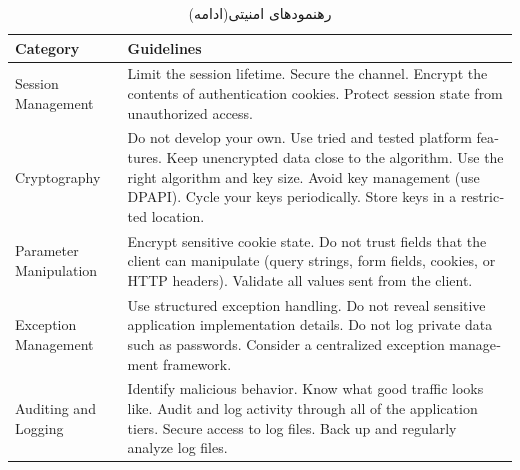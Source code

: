  
 \begin{table}[H] 
         \centering \caption{رهنمودهای امنیتی(ادامه)}
         \renewcommand*{\arraystretch}{2}
  \begin{latin}
 
 
  \begin{tabular}{ p{3cm} p{11cm} } 
       \hline
    
  			\bf Category & \bf Guidelines\\
              \hline
  Session Management & Limit the session lifetime. Secure the channel. Encrypt the contents of authentication cookies. Protect session state from unauthorized access.\\
  			 Cryptography & Do not develop your own. Use tried and tested platform features. Keep unencrypted data close to the algorithm. Use the right algorithm and key size. Avoid key management (use DPAPI). Cycle your keys periodically. Store keys in a restricted location. \\
              Parameter Manipulation & Encrypt sensitive cookie state. Do not trust fields that the client can manipulate (query strings, form fields, cookies, or HTTP headers). Validate all values sent from the client. \\
              Exception Management & Use structured exception handling. Do not reveal sensitive application implementation details. Do not log private data such as passwords. Consider a centralized exception management framework. \\
              Auditing and Logging & Identify malicious behavior. Know what good traffic looks like. Audit and log activity through all of the application tiers. Secure access to log files. Back up and regularly analyze log files. \\
              
\end{tabular}
\end{latin}
\end{table}

